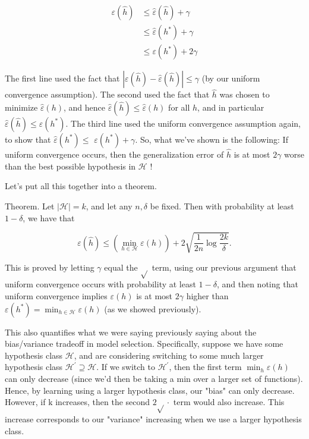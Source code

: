 \documentclass[10pt]{article}
\begin{document}
\[
\begin{aligned}
\varepsilon(\hat{h}) & \leq \hat{\varepsilon}(\hat{h})+\gamma \\
& \leq \hat{\varepsilon}\left(h^{*}\right)+\gamma \\
& \leq \varepsilon\left(h^{*}\right)+2 \gamma
\end{aligned}
\]

The first line used the fact that \(|\varepsilon(\hat{h})-\hat{\varepsilon}(\hat{h})| \leq \gamma\) (by our uniform convergence assumption). The second used the fact that \(\hat{h}\) was chosen to minimize \(\hat{\varepsilon}(h)\), and hence \(\hat{\varepsilon}(\hat{h}) \leq \hat{\varepsilon}(h)\) for all \(h\), and in particular \(\hat{\varepsilon}(\hat{h}) \leq \hat{\varepsilon}\left(h^{*}\right)\). The third line used the uniform convergence assumption again, to show that \(\hat{\varepsilon}\left(h^{*}\right) \leq\) \(\varepsilon\left(h^{*}\right)+\gamma\). So, what we've shown is the following: If uniform convergence occurs, then the generalization error of \(\hat{h}\) is at most \(2 \gamma\) worse than the best possible hypothesis in \(\mathcal{H}\) !

Let's put all this together into a theorem.

Theorem. Let \(|\mathcal{H}|=k\), and let any \(n, \delta\) be fixed. Then with probability at least \(1-\delta\), we have that

\[
\varepsilon(\hat{h}) \leq\left(\min _{h \in \mathcal{H}} \varepsilon(h)\right)+2 \sqrt{\frac{1}{2 n} \log \frac{2 k}{\delta}} .
\]

This is proved by letting \(\gamma\) equal the \(\sqrt{ }\) term, using our previous argument that uniform convergence occurs with probability at least \(1-\delta\), and then noting that uniform convergence implies \(\varepsilon(h)\) is at most \(2 \gamma\) higher than \(\varepsilon\left(h^{*}\right)=\min _{h \in \mathcal{H}} \varepsilon(h)\) (as we showed previously).

This also quantifies what we were saying previously saying about the bias/variance tradeoff in model selection. Specifically, suppose we have some hypothesis class \(\mathcal{H}\), and are considering switching to some much larger hypothesis class \(\mathcal{H}^{\prime} \supseteq \mathcal{H}\). If we switch to \(\mathcal{H}^{\prime}\), then the first term \(\min _{h} \varepsilon(h)\) can only decrease (since we'd then be taking a min over a larger set of functions). Hence, by learning using a larger hypothesis class, our "bias" can only decrease. However, if \(\mathrm{k}\) increases, then the second \(2 \sqrt{ } \cdot\) term would also increase. This increase corresponds to our "variance" increasing when we use a larger hypothesis class.
\end{document}

